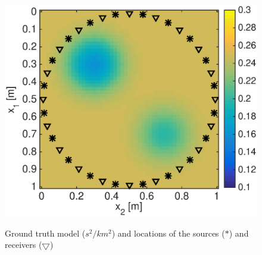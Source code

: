 \documentclass{iopart}
\begin{document}
\begin{figure}
\centering
\includegraphics[scale=.4]{./figs/2D_exp1_a}\\
\caption{Ground truth model ($s^2/km^2$) and locations of the sources ($*$) and receivers ($\bigtriangledown$)}
\label{fig:2D_model}
\end{figure}
\end{document}
